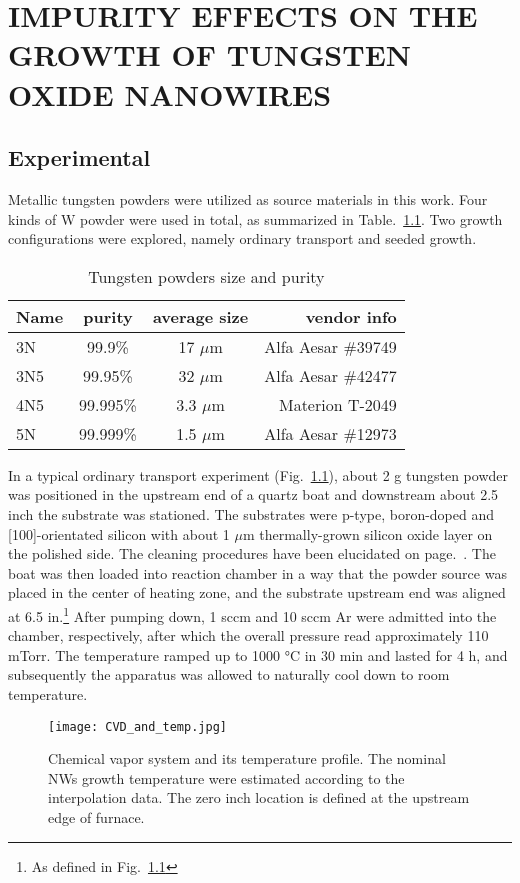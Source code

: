 
\chapter{IMPURITY EFFECTS ON THE GROWTH OF TUNGSTEN OXIDE NANOWIRES}



\section{Experimental}

Metallic tungsten powders were utilized as source materials in this work. Four kinds of W powder were used in total, as summarized in Table.~\ref{tab:powder}. Two growth configurations were explored, namely ordinary transport and seeded growth.
\begin{table}[htb]
\centering
\caption{Tungsten powders size and purity}\label{tab:powder}
\begin{tabular}{lccr}
\toprule
Name & purity & average size & vendor info\\
\midrule
3N   &  99.9\% & 17 $\mu$m & Alfa Aesar \#39749\\
3N5   &  99.95\% & 32 $\mu$m  & Alfa Aesar \#42477\\
4N5   &  99.995\% & 3.3 $\mu$m  & Materion T-2049 \\
5N   &  99.999\% & 1.5 $\mu$m & Alfa Aesar \#12973\\
\bottomrule
\end{tabular}
\end{table}

In a typical ordinary transport experiment (Fig.~\ref{fig:wogrow}), about 2 g tungsten powder was positioned in the upstream end of a quartz boat and downstream about 2.5 inch the substrate was stationed. The substrates were p-type, boron-doped and [100]-orientated silicon with about 1 $\mu$m thermally-grown silicon oxide layer on the polished side. The cleaning procedures have been elucidated on page.~\pageref{ch2sub}. The boat was then loaded into reaction chamber in a way that the powder source was placed in the center of heating zone, and the substrate upstream end was aligned at 6.5 in.\footnote{As defined in Fig.~\ref{fig:wogrow}} After pumping down, 1 sccm  and 10 sccm Ar were admitted into the chamber, respectively, after which the overall pressure read approximately 110 mTorr. The temperature ramped up to 1000 \si{\degreeCelsius} in 30 min and lasted for 4 h, and subsequently the apparatus was allowed to naturally cool down to room temperature.
\begin{figure}[htb]
\centering
\texttt{[image: CVD\_and\_temp.jpg]}
\caption[ NW growth: OT]{Chemical vapor system and its temperature profile. The nominal NWs growth temperature were estimated according to the interpolation data. The zero inch location is defined at the upstream edge of furnace.}
\label{fig:wogrow}
\end{figure}

